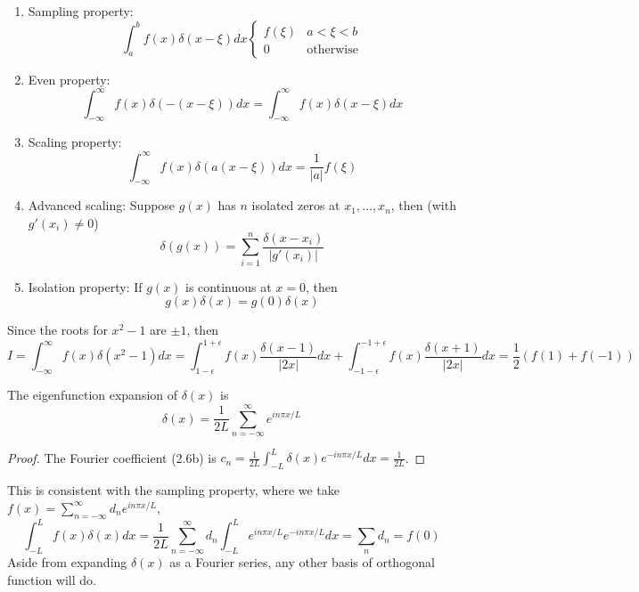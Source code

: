 \documentclass[a4paper]{article}
\begin{document}
\begin{thm}\leavevmode
\begin{enumerate}
    \item Sampling property:
    \begin{equation}
   \int_a^bf(x)\delta(x-\xi)dx
\left\{
        \begin{array}{ll}
      f(\xi) & a<\xi<b\\
      0 & \text{otherwise}
        \end{array}
    \right.\tag{3.9} 
\end{equation}
\item Even property: 
\begin{equation}
    \int_{-\infty}^\infty f(x)\delta(-(x-\xi))dx=\int_{-\infty}^\infty f(x)\delta(x-\xi)dx\tag{3.10}
\end{equation}
\item Scaling property: 
\begin{equation}
    \int_{-\infty}^\infty f(x)\delta(a(x-\xi))dx=\frac{1}{|a|}f(\xi)\tag{3.11}
\end{equation}
\item Advanced scaling:
Suppose $g(x)$ has $n$ isolated zeros at $x_1,\dots,x_n$, then (with $g'(x_i)\neq 0$)
\begin{equation}
    \delta(g(x))=\sum_{i=1}^n\frac{\delta(x-x_i)}{|g'(x_i)|}\tag{3.12}
\end{equation}
\item Isolation property:
If $g(x)$ is continuous at $x=0$, then
\begin{equation}
    g(x)\delta(x)=g(0)\delta(x)\tag{3.13}
\end{equation}
\end{enumerate}
\end{thm}
\begin{eg}
Since the roots for $x^2-1$ are $\pm 1$, then
$$I=\int_{-\infty}^\infty f(x)\delta(x^2-1)dx=\int_{1-\epsilon}^{1+\epsilon}f(x)\frac{\delta(x-1)}{|2x|}dx+\int_{-1-\epsilon}^{-1+\epsilon}f(x)\frac{\delta(x+1)}{|2x|}dx=\frac{1}{2}(f(1)+f(-1))$$
\end{eg}
\begin{prop}
The eigenfunction expansion of $\delta(x)$ is 
\begin{equation}
    \delta(x)=\frac{1}{2L}\sum_{n=-\infty}^\infty e^{in\pi x/L}\tag{3.14}
\end{equation}
\end{prop}
\begin{proof}
The Fourier coefficient (2.6b) is $c_n=\frac{1}{2L}\int_{-L}^L\delta(x)e^{-in\pi x/L}dx=\frac{1}{2L}$. 
\end{proof}
This is consistent with the sampling property, where we take $f(x)=\sum_{n=-\infty}^\infty d_ne^{in\pi x/L}$,
$$\int_{-L}^Lf(x)\delta(x)dx=\frac{1}{2L}\sum_{n=-\infty}^\infty d_n\int_{-L}^Le^{in\pi x/L}e^{-in\pi x/L}dx=\sum_nd_n=f(0)$$
Aside from expanding $\delta(x)$ as a Fourier series, any other basis of orthogonal function will do.
\newpage
\end{document}
